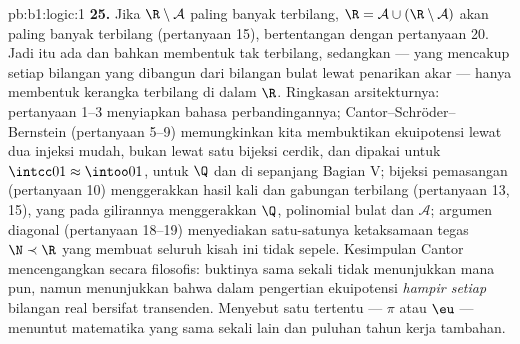 \begin{solution}{pb:b1:logic:1}
\textbf{25.} Jika $\R \setminus \mathcal{A}$ paling banyak terbilang,
$\R = \mathcal{A} \cup (\R \setminus \mathcal{A})$ akan paling banyak
terbilang (pertanyaan 15), bertentangan dengan pertanyaan 20. Jadi
 itu ada dan bahkan membentuk  tak terbilang,
sedangkan  --- yang mencakup setiap bilangan yang dibangun
dari bilangan bulat lewat penarikan akar --- hanya membentuk kerangka
terbilang di dalam $\R$. Ringkasan arsitekturnya: pertanyaan 1--3 menyiapkan
bahasa perbandingannya; Cantor--Schröder--Bernstein (pertanyaan
5--9) memungkinkan kita membuktikan ekuipotensi lewat dua injeksi mudah, bukan
lewat satu bijeksi cerdik, dan dipakai untuk $\intcc01 \approx \intoo01$,
untuk $\Q$ dan di sepanjang Bagian V; bijeksi pemasangan (pertanyaan
10) menggerakkan hasil kali dan gabungan terbilang (pertanyaan 13, 15),
yang pada gilirannya menggerakkan $\Q$, polinomial bulat dan
$\mathcal{A}$; argumen diagonal (pertanyaan 18--19) menyediakan
satu-satunya ketaksamaan tegas $\N \prec \R$ yang membuat seluruh kisah ini
tidak sepele. Kesimpulan Cantor mencengangkan secara filosofis: buktinya
sama sekali tidak menunjukkan  mana pun, namun menunjukkan bahwa dalam
pengertian ekuipotensi \emph{hampir setiap} bilangan real bersifat
transenden. Menyebut satu  tertentu --- $\pi$ atau
$\eu$ --- menuntut matematika yang sama sekali lain dan puluhan tahun
kerja tambahan.

\end{solution}
